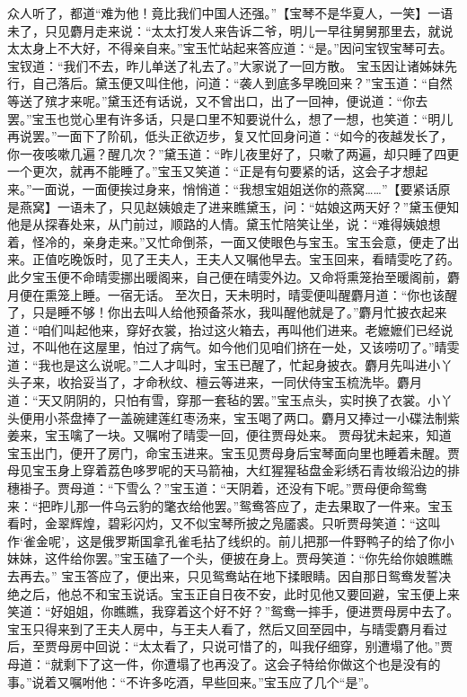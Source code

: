 \documentclass[12pt,oneside]{book}
\begin{document}
众人听了，都道“难为他！竟比我们中国人还强。”【宝琴不是华夏人，一笑】一语未了，只见麝月走来说：“太太打发人来告诉二爷，明儿一早往舅舅那里去，就说太太身上不大好，不得亲自来。”宝玉忙站起来答应道：“是。”因问宝钗宝琴可去。宝钗道：“我们不去，昨儿单送了礼去了。”大家说了一回方散。
宝玉因让诸姊妹先行，自己落后。黛玉便又叫住他，问道：“袭人到底多早晚回来？”宝玉道：“自然等送了殡才来呢。”黛玉还有话说，又不曾出口，出了一回神，便说道：“你去罢。”宝玉也觉心里有许多话，只是口里不知要说什么，想了一想，也笑道：“明儿再说罢。”一面下了阶矶，低头正欲迈步，复又忙回身问道：“如今的夜越发长了，你一夜咳嗽几遍？醒几次？”黛玉道：“昨儿夜里好了，只嗽了两遍，却只睡了四更一个更次，就再不能睡了。”宝玉又笑道：“正是有句要紧的话，这会子才想起来。”一面说，一面便挨过身来，悄悄道：“我想宝姐姐送你的燕窝……”【要紧话原是燕窝】一语未了，只见赵姨娘走了进来瞧黛玉，问：“姑娘这两天好？”黛玉便知他是从探春处来，从门前过，顺路的人情。黛玉忙陪笑让坐，说：“难得姨娘想着，怪冷的，亲身走来。”又忙命倒茶，一面又使眼色与宝玉。宝玉会意，便走了出来。正值吃晚饭时，见了王夫人，王夫人又嘱他早去。宝玉回来，看晴雯吃了药。此夕宝玉便不命晴雯挪出暖阁来，自己便在晴雯外边。又命将熏笼抬至暖阁前，麝月便在熏笼上睡。一宿无话。
至次日，天未明时，晴雯便叫醒麝月道：“你也该醒了，只是睡不够！你出去叫人给他预备茶水，我叫醒他就是了。”麝月忙披衣起来道：“咱们叫起他来，穿好衣裳，抬过这火箱去，再叫他们进来。老嬷嬷们已经说过，不叫他在这屋里，怕过了病气。如今他们见咱们挤在一处，又该唠叨了。”晴雯道：“我也是这么说呢。”二人才叫时，宝玉已醒了，忙起身披衣。麝月先叫进小丫头子来，收拾妥当了，才命秋纹、檀云等进来，一同伏侍宝玉梳洗毕。麝月道：“天又阴阴的，只怕有雪，穿那一套毡的罢。”宝玉点头，实时换了衣裳。小丫头便用小茶盘捧了一盖碗建莲红枣汤来，宝玉喝了两口。麝月又捧过一小碟法制紫姜来，宝玉噙了一块。又嘱咐了晴雯一回，便往贾母处来。
贾母犹未起来，知道宝玉出门，便开了房门，命宝玉进来。宝玉见贾母身后宝琴面向里也睡着未醒。贾母见宝玉身上穿着荔色哆罗呢的天马箭袖，大红猩猩毡盘金彩绣石青妆缎沿边的排穗褂子。贾母道：“下雪么？”宝玉道：“天阴着，还没有下呢。”贾母便命鸳鸯来：“把昨儿那一件乌云豹的氅衣给他罢。”鸳鸯答应了，走去果取了一件来。宝玉看时，金翠辉煌，碧彩闪灼，又不似宝琴所披之凫靥裘。只听贾母笑道：“这叫作‘雀金呢’，这是俄罗斯国拿孔雀毛拈了线织的。前儿把那一件野鸭子的给了你小妹妹，这件给你罢。”宝玉磕了一个头，便披在身上。贾母笑道：“你先给你娘瞧瞧去再去。”
宝玉答应了，便出来，只见鸳鸯站在地下揉眼睛。因自那日鸳鸯发誓决绝之后，他总不和宝玉说话。宝玉正自日夜不安，此时见他又要回避，宝玉便上来笑道：“好姐姐，你瞧瞧，我穿着这个好不好？”鸳鸯一摔手，便进贾母房中去了。宝玉只得来到了王夫人房中，与王夫人看了，然后又回至园中，与晴雯麝月看过后，至贾母房中回说：“太太看了，只说可惜了的，叫我仔细穿，别遭塌了他。”贾母道：“就剩下了这一件，你遭塌了也再没了。这会子特给你做这个也是没有的事。”说着又嘱咐他：“不许多吃酒，早些回来。”宝玉应了几个“是”。
\end{document}
